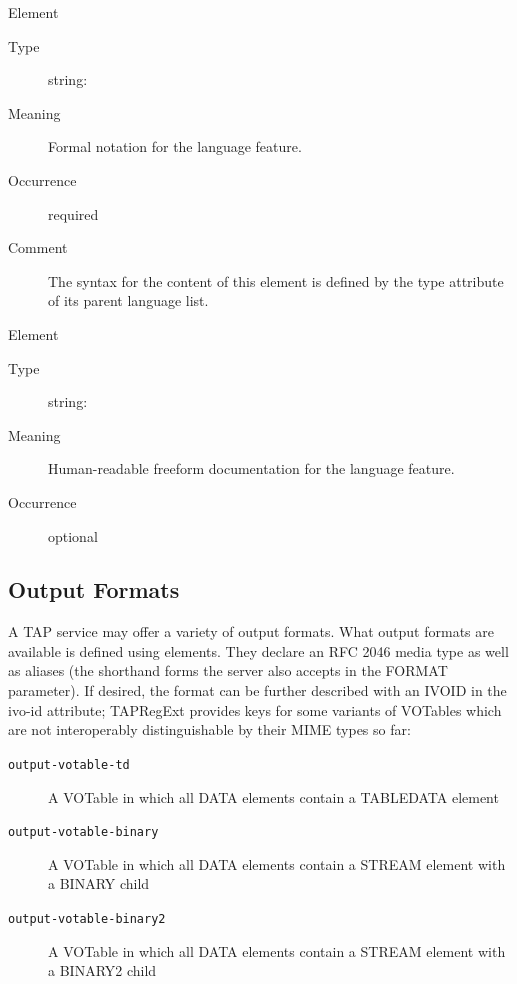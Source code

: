 \documentclass{ivoa}
\begin{document}
\begingroup\small\begin{bigdescription}\item[Element \xmlel{form}]
\begin{description}
\item[Type] string: 
\item[Meaning] 
          	Formal notation for the language feature.
        	
\item[Occurrence] required
\item[Comment] 
          	The syntax for the content of this element is defined by the
          	type attribute of its parent language list.
        	

\end{description}
\item[Element \xmlel{description}]
\begin{description}
\item[Type] string: 
\item[Meaning] 
          	Human-readable freeform documentation for the language feature.
        	
\item[Occurrence] optional

\end{description}


\end{bigdescription}\endgroup

\endgroup

\subsection{Output Formats}

\label{outforms}

A TAP service may offer a variety of output formats.
What output formats are available is defined using
 elements.   They 
declare an RFC 2046 media type \citep{std:MIME} as well
as aliases (the shorthand forms the server also accepts in the 
FORMAT parameter).  If desired, the format can be further described with an
IVOID in the ivo-id attribute; TAPRegExt provides keys for some variants of
VOTables which are not interoperably distinguishable by their MIME types so far:


\begin{description}
\item[\normalfont\texttt{output-votable-td}]A VOTable in which all DATA elements contain a TABLEDATA element
\item[\normalfont\texttt{output-votable-binary}]A VOTable in which all DATA elements contain a STREAM element
	with a BINARY child
\item[\normalfont\texttt{output-votable-binary2}]A VOTable in which all DATA elements contain a STREAM element
	with a BINARY2 child
\end{description}
\end{document}

